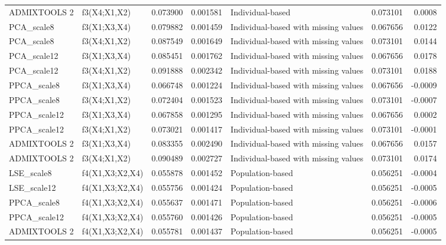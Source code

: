 \begin{tabular}{llrrlrr}
ADMIXTOOLS 2 &    f3(X4;X1,X2) & 0.073900 &        0.001581 &                     Individual-based &    0.073101 &  0.0008 \\
  PCA\_scale8 &    f3(X1;X3,X4) & 0.079882 &        0.001459 & Individual-based with missing values &    0.067656 &  0.0122 \\
  PCA\_scale8 &    f3(X4;X1,X2) & 0.087549 &        0.001649 & Individual-based with missing values &    0.073101 &  0.0144 \\
 PCA\_scale12 &    f3(X1;X3,X4) & 0.085451 &        0.001762 & Individual-based with missing values &    0.067656 &  0.0178 \\
 PCA\_scale12 &    f3(X4;X1,X2) & 0.091888 &        0.002342 & Individual-based with missing values &    0.073101 &  0.0188 \\
 PPCA\_scale8 &    f3(X1;X3,X4) & 0.066748 &        0.001224 & Individual-based with missing values &    0.067656 & -0.0009 \\
 PPCA\_scale8 &    f3(X4;X1,X2) & 0.072404 &        0.001523 & Individual-based with missing values &    0.073101 & -0.0007 \\
PPCA\_scale12 &    f3(X1;X3,X4) & 0.067858 &        0.001295 & Individual-based with missing values &    0.067656 &  0.0002 \\
PPCA\_scale12 &    f3(X4;X1,X2) & 0.073021 &        0.001417 & Individual-based with missing values &    0.073101 & -0.0001 \\
ADMIXTOOLS 2 &    f3(X1;X3,X4) & 0.083355 &        0.002490 & Individual-based with missing values &    0.067656 &  0.0157 \\
ADMIXTOOLS 2 &    f3(X4;X1,X2) & 0.090489 &        0.002727 & Individual-based with missing values &    0.073101 &  0.0174 \\
  LSE\_scale8 & f4(X1,X3;X2,X4) & 0.055878 &        0.001452 &                     Population-based &    0.056251 & -0.0004 \\
 LSE\_scale12 & f4(X1,X3;X2,X4) & 0.055756 &        0.001424 &                     Population-based &    0.056251 & -0.0005 \\
 PPCA\_scale8 & f4(X1,X3;X2,X4) & 0.055637 &        0.001471 &                     Population-based &    0.056251 & -0.0006 \\
PPCA\_scale12 & f4(X1,X3;X2,X4) & 0.055760 &        0.001426 &                     Population-based &    0.056251 & -0.0005 \\
ADMIXTOOLS 2 & f4(X1,X3;X2,X4) & 0.055781 &        0.001437 &                     Population-based &    0.056251 & -0.0005 \\

\end{tabular}
